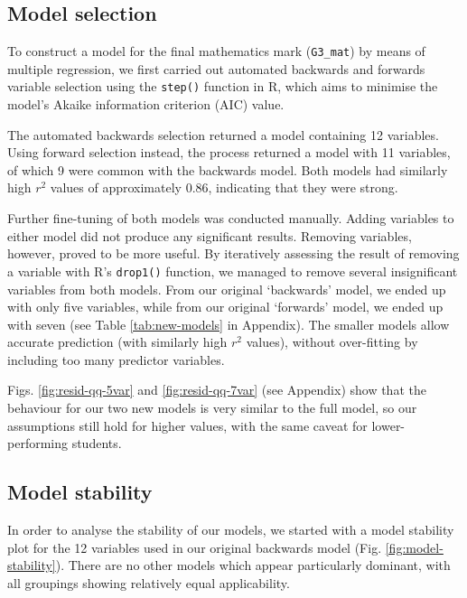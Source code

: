 \documentclass[a4paper,9pt,twocolumn,twoside,]{pinp}
\begin{document}
\hypertarget{model-selection}{%
\subsection{Model selection}\label{model-selection}}

To construct a model for the final mathematics mark (\texttt{G3\_mat})
by means of multiple regression, we first carried out automated
backwards and forwards variable selection using the \texttt{step()}
function in R, which aims to minimise the model's Akaike information
criterion (AIC) value.

The automated backwards selection returned a model containing 12
variables. Using forward selection instead, the process returned a model
with 11 variables, of which 9 were common with the backwards model. Both
models had similarly high \(r^2\) values of approximately 0.86,
indicating that they were strong.

Further fine-tuning of both models was conducted manually. Adding
variables to either model did not produce any significant results.
Removing variables, however, proved to be more useful. By iteratively
assessing the result of removing a variable with R's \texttt{drop1()}
function, we managed to remove several insignificant variables from both
models. From our original `backwards' model, we ended up with only five
variables, while from our original `forwards' model, we ended up with
seven (see Table \ref{tab:new-models} in Appendix). The smaller models
allow accurate prediction (with similarly high \(r^2\) values), without
over-fitting by including too many predictor variables.

Figs. \ref{fig:resid-qq-5var} and \ref{fig:resid-qq-7var} (see Appendix)
show that the behaviour for our two new models is very similar to the
full model, so our assumptions still hold for higher values, with the
same caveat for lower-performing students.

\hypertarget{model-stability}{%
\subsection{Model stability}\label{model-stability}}

In order to analyse the stability of our models, we started with a model
stability plot for the 12 variables used in our original backwards model
(Fig. \ref{fig:model-stability}). There are no other models which appear
particularly dominant, with all groupings showing relatively equal
applicability.
\end{document}
